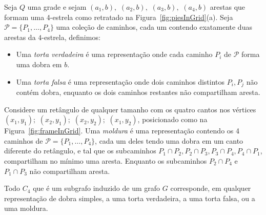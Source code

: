 \begin{definition} \label{defi:tortasFrame}

Seja $ Q $ uma grade e sejam $ (a_1, b),$ $(a_2, b),$ $(a_3, b),$ $(a_4, b)$ arestas que formam uma 4-estrela como retratado na Figura~\ref{fig:piesInGrid}(a). Seja  $ \mathcal{P} = \{P_1, \dots , P_4\}$ uma coleção de caminhos, cada um contendo exatamente duas arestas da $4$-estrela, definimos:

\begin{itemize}
\item Uma \emph{torta verdadeira} é uma representação onde cada caminho $P_i$ de $ \mathcal{P} $ forma uma dobra em $b$.

\item Uma \emph {torta falsa} é uma representação onde dois caminhos distintos $P_i, P_j$  não contém dobra, enquanto os dois caminhos restantes não compartilham aresta. 




\end{itemize}
\end{definition}

\begin{definition} \label{defi:tortasFrame2}
 Considere um retângulo de qualquer tamanho com os quatro cantos nos vértices  $ (x_1, y_1);$ $(x_2, y_1);$ $(x_2, y_2);$ $(x_1, y_2)$, posicionado como na Figura~\ref{fig:frameInGrid}. Uma \emph{moldura} é uma representação contendo os 4 caminhos de $\mathcal{P} =  \{ P_1, \dots, P_4\} $, cada um deles tendo uma dobra em um canto diferente do retângulo, e tal que os subcaminhos $ P_1 \cap P_2, P_2 \cap P_3, P_3 \cap P_4, P_4 \cap P_1 $, compartilham no mínimo uma aresta. Enquanto os subcaminhos  $ P_2 \cap P_4 $ e $ P_1 \cap P_3 $ não compartilham aresta.


\end{definition}


%


\begin{lema}\label{lem:representacaoC4}
\cite{golumbic2009} Todo $C_4$ que é um subgrafo induzido de um grafo $ G $ corresponde, em qualquer representação de dobra simples, a uma torta verdadeira, a uma torta falsa, ou a uma moldura.
\end{lema}

